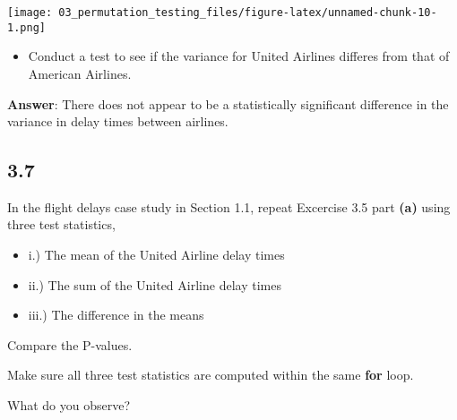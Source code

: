 \documentclass[
  12pt,
]{report}
\providecommand{\tightlist}{%
  \setlength{\itemsep}{0pt}\setlength{\parskip}{0pt}}
\begin{document}
\texttt{[image: 03\_permutation\_testing\_files/figure-latex/unnamed-chunk-10-1.png]}

\begin{itemize}
\tightlist
\item
  Conduct a test to see if the variance for United Airlines differes
  from that of American Airlines.
\end{itemize}

\textbf{Answer}: There does not appear to be a statistically significant
difference in the variance in delay times between airlines.

\newpage

\hypertarget{section-6}{%
\subsection{3.7}\label{section-6}}

In the flight delays case study in Section 1.1, repeat Excercise 3.5
part \textbf{(a)} using three test statistics,

\begin{itemize}
\tightlist
\item
  i.) The mean of the United Airline delay times
\item
  ii.) The sum of the United Airline delay times
\item
  iii.) The difference in the means
\end{itemize}

Compare the P-values.

Make sure all three test statistics are computed within the same
\textbf{for} loop.

What do you observe?
\end{document}
